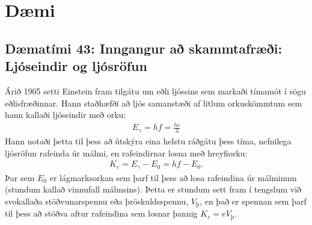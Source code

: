 \ifdefined \wholebook \else\documentclass[oneside]{book}\usepackage{EdlBook}\graphicspath{{figures/}}
\begin{document}

\newpage

\section{Dæmi}

\subsection*{Dæmatími 43: Inngangur að skammtafræði: Ljóseindir og ljósröfun}

\begin{tcolorbox}
Árið 1905 setti Einstein fram tilgátu um eðli ljóssins sem markaði tímamót í sögu eðlisfræðinnar. Hann staðhæfði að ljós samanstæði af litlum orkuskömmtum sem hann kallaði ljóseindir með orku:
\begin{align*}
    E_\gamma = hf = \frac{hc}{\lambda}
\end{align*}
Hann notaði þetta til þess að útskýra eina helstu ráðgátu þess tíma, nefnilega ljósröfun rafeinda úr málmi, en rafeindirnar losna með hreyfiorku:
\begin{align*}
    K_e = E_{\gamma} - E_0 = hf - E_0.
\end{align*}
Þar sem $E_0$ er lágmarksorkan sem þarf til þess að losa rafeindina úr málminum (stundum kallað vinnufall málmsins). Þetta er stundum sett fram í tengslum við svokallaða stöðvunarspennu eða þröskuldsspennu, $V_{\text{þ}}$, en það er spennan sem þarf til þess að stöðva aftur rafeindina sem losnar þannig $K_e = eV_{\text{þ}}$.
\end{tcolorbox}
\end{document}
